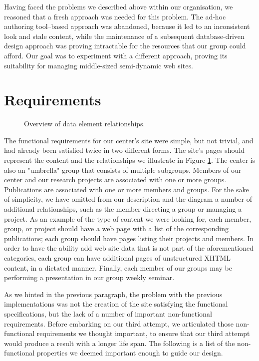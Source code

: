 \documentclass[10pt]{article}
\begin{document}
Having faced the problems we described above within our organisation, we reasoned that
a fresh approach was needed for this problem.
The ad-hoc authoring tool--based approach was abandoned,
because it led to an inconsistent look and stale content,
while the maintenance of a subsequent database-driven
design approach was proving intractable for the resources that
our group could afford.
Our goal was to experiment with a different approach,
proving its suitability for managing middle-sized semi-dynamic
web sites.

\section{Requirements}
\label{sec:req}

\begin{figure}
\begin{center}
\leavevmode
{}
\end{center}
\caption{
\label{fig:diag}
Overview of data element relationships.}
\end{figure}

The functional requirements for our center's site were
simple, but not trivial, and had already been satisfied
twice in two different forms.
The site's pages should represent the content and the relationships
we illustrate in Figure \ref{fig:diag}.
The center is also an "umbrella" group that consists of multiple subgroups.
Members of our center and our research projects are associated
with one or more groups.
Publications are associated
with one or more members and groups.
For the sake of simplicity,
we have omitted from our description and the diagram
a number of additional relationships,
such as the member directing a group or managing a project.
As an example of the type of content we were looking for, 
each member, group, or project should have a web page with a list
of the corresponding publications;
each group should have pages listing their projects and members. 
In order to have the ability add web site data that is not part of the aforementioned categories,
each group can have additional pages of unstructured {\sc XHTML} content, in a dictated manner.
Finally, each member of our groups may be performing a presentation in our group weekly seminar.

As we hinted in the previous paragraph, the problem with
the previous implementations was not the creation of the site
satisfying the functional specifications,
but the lack of a number of important non-functional requirements.
Before embarking on our third attempt,
we articulated those non-functional requirements
we thought important, to ensure that our third attempt would produce
a result with a longer life span.
The following is a list of the non-functional properties
we deemed important enough to guide our design.
\end{document}
